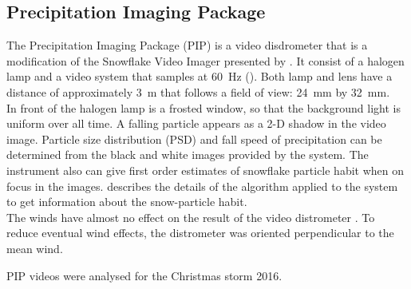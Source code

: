 \newpage
\subsection{Precipitation Imaging Package}

The Precipitation Imaging Package (PIP) is a video disdrometer that is a modification of the Snowflake Video Imager presented by \citet{newman_presenting_2009}. It consist of a halogen lamp and a video system that samples at \SI{60}{\Hz} (). 
Both lamp and lens have a distance of approximately \SI{3}{\metre} that follows a field of view: \SI{24}{\mm} by  \SI{32}{\mm}. 
\\
In front of the halogen lamp is a frosted window, so that the background light is uniform over all time. A falling particle appears as a 2-D shadow in the video image. 
Particle size distribution (PSD) and fall speed of precipitation can be determined from the black and white images provided by the system. The instrument also can give first order estimates of snowflake particle habit when on focus in the images.  
\citet{newman_presenting_2009} describes the details of the algorithm applied to the system to get information about the snow-particle habit. \\
The winds have almost no effect on the result of the video distrometer \citep{newman_presenting_2009}. To reduce eventual wind effects, the distrometer was oriented perpendicular to the mean wind.
\par\medskip\noindent
PIP videos were analysed for the Christmas storm 2016. %

